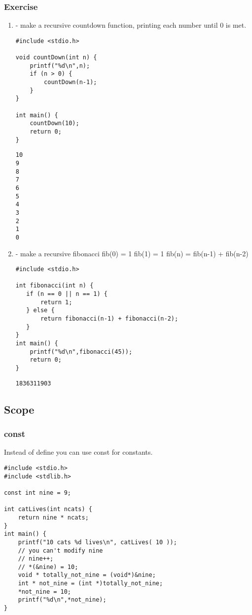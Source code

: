 \documentclass[11pt]{article}
\begin{document}
\subsubsection{Exercise}
\label{sec:org70085cf}
\begin{enumerate}
\item - make a recursive countdown function, printing each number until 0 is met.
\label{sec:org1c7e9d4}

\begin{verbatim}
#include <stdio.h>

void countDown(int n) {
    printf("%d\n",n);
    if (n > 0) {
        countDown(n-1);
    }
}

int main() {
    countDown(10);
    return 0;
}

\end{verbatim}

\begin{verbatim}
10
9
8
7
6
5
4
3
2
1
0
\end{verbatim}

\item - make a recursive fibonacci
\label{sec:org92f1873}
fib(0) = 1
fib(1) = 1
fib(n) = fib(n-1) + fib(n-2)
\begin{verbatim}
#include <stdio.h>

int fibonacci(int n) {
   if (n == 0 || n == 1) {
       return 1;
   } else {
       return fibonacci(n-1) + fibonacci(n-2);
   }
}
int main() {
    printf("%d\n",fibonacci(45));
    return 0;
}
\end{verbatim}

\begin{verbatim}
1836311903
\end{verbatim}
\end{enumerate}

\subsection{Scope}
\label{sec:orge9a2ef1}
\subsubsection{const}
\label{sec:org0fcc271}

Instead of define you can use const for constants.

\begin{verbatim}
#include <stdio.h>
#include <stdlib.h>

const int nine = 9;

int catLives(int ncats) {
    return nine * ncats;
}
int main() {    
    printf("10 cats %d lives\n", catLives( 10 ));
    // you can't modify nine
    // nine++;
    // *(&nine) = 10;
    void * totally_not_nine = (void*)&nine;
    int * not_nine = (int *)totally_not_nine;
    *not_nine = 10;
    printf("%d\n",*not_nine);
}
\end{verbatim}
\end{document}
